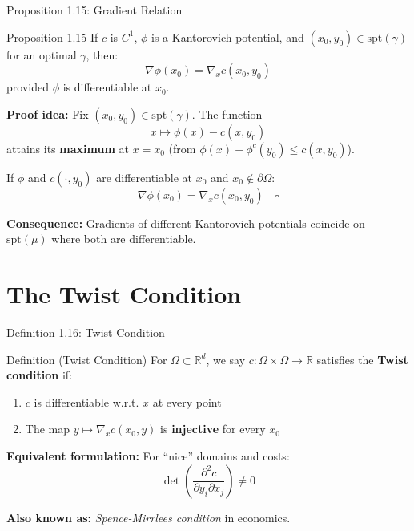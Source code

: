 \documentclass[aspectratio=169]{beamer}
\newcommand{\R}{\mathbb{R}}
\begin{document}
\begin{frame}{Proposition 1.15: Gradient Relation}
\begin{block}{Proposition 1.15}
If $c$ is $C^1$, $\phi$ is a Kantorovich potential, and $(x_0, y_0) \in \text{spt}(\gamma)$ for an optimal $\gamma$, then:
\[
\boxed{\nabla \phi(x_0) = \nabla_x c(x_0, y_0)}
\]
provided $\phi$ is differentiable at $x_0$.
\end{block}

\vspace{0.3cm}
\textbf{Proof idea:} Fix $(x_0, y_0) \in \text{spt}(\gamma)$. The function
\[
x \mapsto \phi(x) - c(x, y_0)
\]
attains its \textbf{maximum} at $x = x_0$ (from $\phi(x) + \phi^c(y_0) \leq c(x, y_0)$).

\vspace{0.2cm}
If $\phi$ and $c(\cdot, y_0)$ are differentiable at $x_0$ and $x_0 \notin \partial\Omega$:
\[
\nabla \phi(x_0) = \nabla_x c(x_0, y_0) \quad \square
\]

\vspace{0.3cm}
\textbf{Consequence:} Gradients of different Kantorovich potentials coincide on $\text{spt}(\mu)$ where both are differentiable.
\end{frame}

\section{The Twist Condition}

\begin{frame}{Definition 1.16: Twist Condition}
\begin{block}{Definition (Twist Condition)}
For $\Omega \subset \R^d$, we say $c: \Omega \times \Omega \to \R$ satisfies the \textbf{Twist condition} if:
\begin{enumerate}
    \item $c$ is differentiable w.r.t. $x$ at every point
    \item The map $y \mapsto \nabla_x c(x_0, y)$ is \textbf{injective} for every $x_0$
\end{enumerate}
\end{block}

\vspace{0.3cm}
\textbf{Equivalent formulation:} For ``nice'' domains and costs:
\[
\det\left(\frac{\partial^2 c}{\partial y_i \partial x_j}\right) \neq 0
\]

\vspace{0.3cm}
\textbf{Also known as:} \textit{Spence-Mirrlees condition} in economics.
\end{frame}
\end{document}
